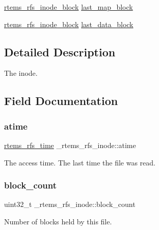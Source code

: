 \begin{DoxyCompactItemize}
\begin{tabbing}
\end{tabbing}\item 
\mbox{\hyperlink{rtems-rfs-inode_8h_aa30717f37e5238a8f6387b4d0dbb2ae3}{rtems\+\_\+rfs\+\_\+inode\+\_\+block}} \mbox{\hyperlink{struct__rtems__rfs__inode_a8fd9bd3c81ca28edf46281a14bb71200}{last\+\_\+map\+\_\+block}}
\item 
\mbox{\hyperlink{rtems-rfs-inode_8h_aa30717f37e5238a8f6387b4d0dbb2ae3}{rtems\+\_\+rfs\+\_\+inode\+\_\+block}} \mbox{\hyperlink{struct__rtems__rfs__inode_ac9a7ef1f60dd6a35f6e70801c0e46068}{last\+\_\+data\+\_\+block}}
\end{DoxyCompactItemize}


\subsection{Detailed Description}
The inode. 

\subsection{Field Documentation}
\mbox{\label{struct__rtems__rfs__inode_ae28356c51f71254e11b3578a9c36df81}} 
\subsubsection{\texorpdfstring{atime}{atime}}
{\footnotesize\ttfamily \mbox{\hyperlink{rtems-rfs-inode_8h_a7877cc60240d76cccb89acaffdd20aa6}{rtems\+\_\+rfs\+\_\+time}} \+\_\+rtems\+\_\+rfs\+\_\+inode\+::atime}

The access time. The last time the file was read. \mbox{\label{struct__rtems__rfs__inode_a4dd1d6c2203dce216162de495fc352f1}} 
\subsubsection{\texorpdfstring{block\_count}{block\_count}}
{\footnotesize\ttfamily uint32\+\_\+t \+\_\+rtems\+\_\+rfs\+\_\+inode\+::block\+\_\+count}

Number of blocks held by this file. \mbox{\label{struct__rtems__rfs__inode_a5bb045a3c36ef0babebbbeebc8a52340}} 
